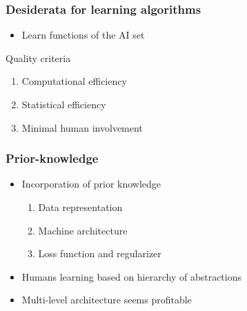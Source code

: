 \begin{frame}
	\frametitle{Desiderata for learning algorithms}
	\begin{itemize}
		\item Learn functions of the AI set
	\end{itemize}
	\begin{block}{Quality criteria}
		\begin{enumerate}
			\item Computational efficiency
			\item Statistical efficiency
			\item Minimal human involvement
		\end{enumerate}
	\end{block}
\end{frame}

\begin{frame}
	\frametitle{Prior-knowledge}
	\begin{itemize}
		\item Incorporation of prior knowledge
		\begin{enumerate}
			\item Data representation
			\item Machine architecture
			\item Loss function and regularizer
		\end{enumerate}
		\item Humans learning based on hierarchy of abstractions
		\item Multi-level architecture seems profitable
	\end{itemize}
\end{frame}

